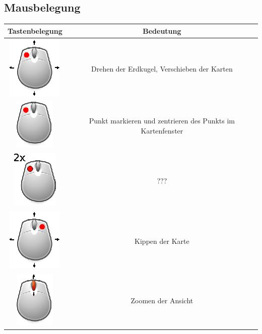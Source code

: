 \documentclass[10pt]{scrreprt}
\begin{document}
\subsection*{Mausbelegung}
\begin{center}
\begin{tabular}{|c|c|}
\hline 
\textbf{Tastenbelegung} & \textbf{Bedeutung} \\ 
\hline
\hline
\includegraphics[scale=2.0]{KeyImages/mouseDrag_left.eps} & Drehen der Erdkugel, Verschieben der Karten \\ 
\hline 
\includegraphics[scale=2.0]{KeyImages/mouseclick_left.eps} & Punkt markieren und zentrieren des Punkts im Kartenfenster \\
\hline
\includegraphics[scale=2.0]{KeyImages/mouseDoubleClick_left.eps} & ??? \\
\hline
\includegraphics[scale=2.0]{KeyImages/mouseDrag_right.eps} & Kippen der Karte \\
\hline
\includegraphics[scale=2.0]{KeyImages/mouse_scrollen.eps} & Zoomen der Ansicht \\
\hline
\end{tabular} 
\end{center}
\end{document}
